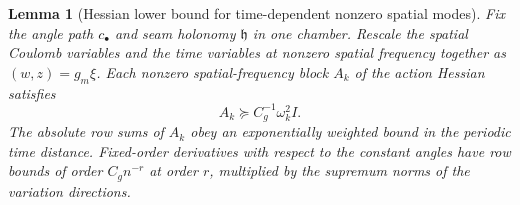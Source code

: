 \documentclass[11pt,a4paper]{article}
\newtheorem{lemma}[theorem]{Lemma}
\numberwithin{equation}{section}
\newcommand{\hper}{\mathfrak h}
\begin{document}
\begin{lemma}[Hessian lower bound for time-dependent nonzero spatial modes]\label{lem:cam-soft-normal}
Fix the angle path \(c_\bullet\) and seam holonomy \(\hper\) in one chamber. Rescale the spatial Coulomb variables and the time variables at nonzero spatial frequency together as \((w,z)=g_m\xi\). Each nonzero spatial-frequency block \(A_k\) of the action Hessian satisfies
\begin{equation}
 A_k\succeq C_g^{-1}\omega_k^2 I .
 \label{eq:cam-soft-normal}
\end{equation}
The absolute row sums of \(A_k\) obey an exponentially weighted bound in the periodic time distance. Fixed-order derivatives with respect to the constant angles have row bounds of order \(C_g n^{-r}\) at order \(r\), multiplied by the supremum norms of the variation directions.
\end{lemma}
\end{document}
